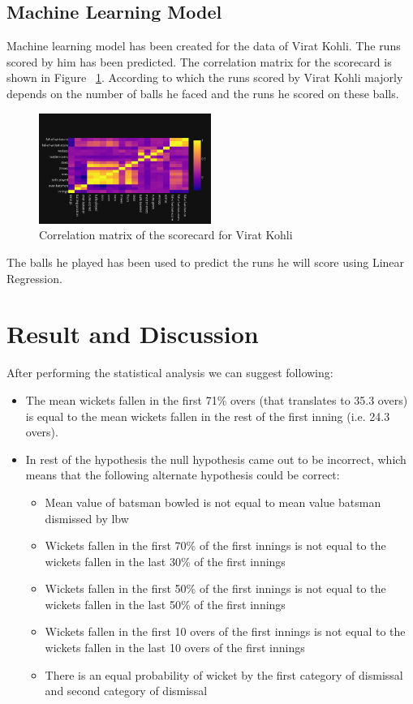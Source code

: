\documentclass[fleqn,10pt]{wlscirep}
\begin{document}
\subsection{Machine Learning Model}
Machine learning model has been created for the data of Virat Kohli. The runs scored by him has been predicted.
The correlation matrix for the scorecard is shown in Figure ~\ref{fig:twenty}. According to which the runs scored by Virat Kohli
majorly depends on the number of balls he faced and the runs he scored on these balls.
\begin{figure}[H]
    \centering
    \includegraphics[width=0.5\textwidth]{correlation.png}
    \caption{Correlation matrix of the scorecard for Virat Kohli}
    \label{fig:twenty}
  \end{figure}
The balls he played has been used to predict the runs he will score using Linear Regression.
\section{Result and Discussion}
After performing the statistical analysis we can suggest following:
\begin{itemize}
    \item The mean wickets fallen in the first 71\% overs (that translates to 35.3 overs) is equal to the mean wickets fallen in the rest of the first inning (i.e. 24.3 overs).
    \item In rest of the hypothesis the null hypothesis came out to be incorrect, which means that the following alternate hypothesis could be correct:
        \begin{itemize}
          \item Mean value of batsman bowled is not equal to mean value batsman dismissed by lbw
          \item Wickets fallen in the first 70\% of the first innings is not equal to the wickets fallen in the last 30\% of the first innings
          \item Wickets fallen in the first 50\% of the first innings is not equal to the wickets fallen in the last 50\% of the first innings
          \item Wickets fallen in the first 10 overs of the first innings is not equal to the wickets fallen in the last 10 overs of the first innings
          \item There is an equal probability of wicket by the first category of dismissal and second category of dismissal
        \end{itemize}
\end{itemize}
\end{document}
